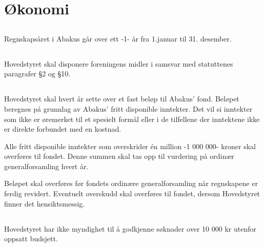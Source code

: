 \section{Økonomi}

\subsection{}
Regnskapsåret i Abakus går over ett -1- år fra 1.januar til 31. desember.

\subsection{}
Hovedstyret skal disponere foreningens midler i samsvar med statuttenes
paragrafer §2 og §10.

\subsection{}
Hovedstyret skal hvert år sette over et fast beløp til Abakus' fond. Beløpet
beregnes på grunnlag av Abakus' fritt disponible inntekter. Det vil si
inntekter som ikke er øremerket til et spesielt formål eller i de tilfellene
der inntektene ikke er direkte forbundet med en kostnad.

Alle fritt disponible inntekter som overskrider én million -1 000 000- kroner
skal overføres til fondet. Denne summen skal tas opp til vurdering på ordinær
generalforsamling hvert år.

Beløpet skal overføres før fondets ordinære generalforsamling når regnskapene
er ferdig revidert. Eventuelt overskudd skal overføres til fondet, dersom
Hovedstyret finner det hensiktsmessig.

\subsection{}
Hovedstyret har ikke myndighet til å godkjenne søknader over 10 000 kr utenfor
oppsatt budsjett.
